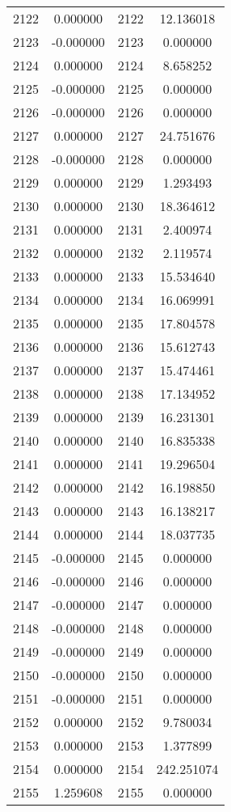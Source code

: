 \documentclass[12pt]{article}
\begin{document}
\begin{longtable}{@{}cccc@{}}
2122 & 0.000000 & 2122 & 12.136018 \\
2123 & -0.000000 & 2123 & 0.000000 \\
2124 & 0.000000 & 2124 & 8.658252 \\
2125 & -0.000000 & 2125 & 0.000000 \\
2126 & -0.000000 & 2126 & 0.000000 \\
2127 & 0.000000 & 2127 & 24.751676 \\
2128 & -0.000000 & 2128 & 0.000000 \\
2129 & 0.000000 & 2129 & 1.293493 \\
2130 & 0.000000 & 2130 & 18.364612 \\
2131 & 0.000000 & 2131 & 2.400974 \\
2132 & 0.000000 & 2132 & 2.119574 \\
2133 & 0.000000 & 2133 & 15.534640 \\
2134 & 0.000000 & 2134 & 16.069991 \\
2135 & 0.000000 & 2135 & 17.804578 \\
2136 & 0.000000 & 2136 & 15.612743 \\
2137 & 0.000000 & 2137 & 15.474461 \\
2138 & 0.000000 & 2138 & 17.134952 \\
2139 & 0.000000 & 2139 & 16.231301 \\
2140 & 0.000000 & 2140 & 16.835338 \\
2141 & 0.000000 & 2141 & 19.296504 \\
2142 & 0.000000 & 2142 & 16.198850 \\
2143 & 0.000000 & 2143 & 16.138217 \\
2144 & 0.000000 & 2144 & 18.037735 \\
2145 & -0.000000 & 2145 & 0.000000 \\
2146 & -0.000000 & 2146 & 0.000000 \\
2147 & -0.000000 & 2147 & 0.000000 \\
2148 & -0.000000 & 2148 & 0.000000 \\
2149 & -0.000000 & 2149 & 0.000000 \\
2150 & -0.000000 & 2150 & 0.000000 \\
2151 & -0.000000 & 2151 & 0.000000 \\
2152 & 0.000000 & 2152 & 9.780034 \\
2153 & 0.000000 & 2153 & 1.377899 \\
2154 & 0.000000 & 2154 & 242.251074 \\
2155 & 1.259608 & 2155 & 0.000000 \\

\end{longtable}
\end{document}
